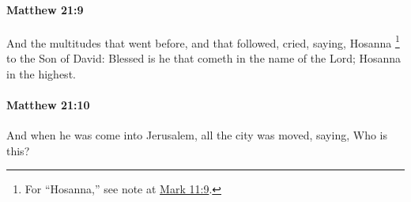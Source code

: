 		\paragraph{Matthew 21:9} %
			\label{MATTHEW-21-9}

			And the multitudes that went before, and that followed, cried, saying, Hosanna%
				\footnote{%
					For ``Hosanna,'' see note at \hyperref[MARK-11-9]{Mark 11:9}.
					}
			to the Son of David: Blessed is he that cometh in the name of the Lord; Hosanna in the highest.

			\begin{framed}
			\scriptsize
				\begin{compactdesc}
					\item[SBLG] 
				\end{compactdesc}
			\end{framed}

		\paragraph{Matthew 21:10} %
			\label{MATTHEW-21-10}

			And when he was come into Jerusalem, all the city was moved, saying, Who is this?

